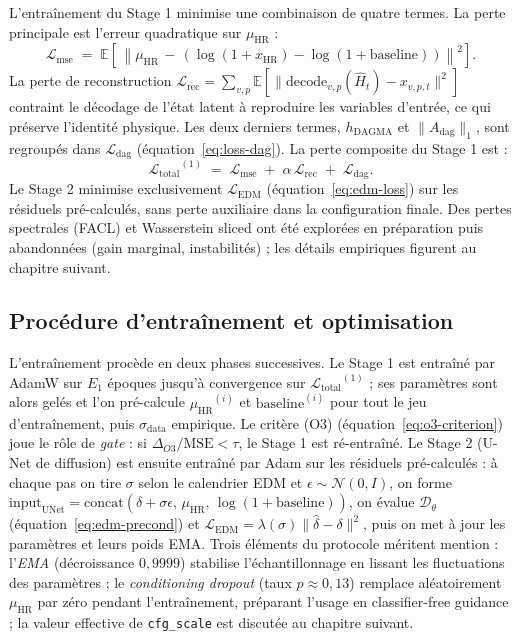 \documentclass[14pt,a4paper,openany]{extreport}
\theoremstyle{definition}
\newcommand{\HR}{\ensuremath{\text{HR}}}
\newcommand{\xHR}{\ensuremath{x_{\HR}}}
\newcommand{\muHR}{\ensuremath{\mu_{\HR}}}
\newcommand{\Adag}{\ensuremath{A_{\mathrm{dag}}}}
\newcommand{\Lmse}{\ensuremath{\mathcal{L}_{\mathrm{mse}}}}
\newcommand{\Lrec}{\ensuremath{\mathcal{L}_{\mathrm{rec}}}}
\newcommand{\LEDM}{\ensuremath{\mathcal{L}_{\mathrm{EDM}}}}
\newcommand{\Ltotal}{\ensuremath{\mathcal{L}_{\mathrm{total}}}}
\begin{document}
L'entraînement du Stage 1 minimise une combinaison de quatre termes. La perte principale est l'erreur quadratique sur $\muHR$ :
\begin{equation}
  \Lmse \;=\; \mathbb{E}\!\left[\, \left\| \muHR \,-\, \left( \log(1 + \xHR) - \log(1 + \mathrm{baseline}) \right) \right\|^2 \right].
  \label{eq:loss-mse}
\end{equation}
La perte de reconstruction $\Lrec = \sum_{v,p} \mathbb{E}[\| \mathrm{decode}_{v,p}(\hat{H}_t) - x_{v,p,t} \|^2]$ contraint le décodage de l'état latent à reproduire les variables d'entrée, ce qui préserve l'identité physique. Les deux derniers termes, $h_{\mathrm{DAGMA}}$ et $\|\Adag\|_1$, sont regroupés dans $\mathcal{L}_{\mathrm{dag}}$ (équation~\ref{eq:loss-dag}). La perte composite du Stage 1 est :
\begin{equation}
  \Ltotal^{(1)} \;=\; \Lmse \;+\; \alpha\, \Lrec \;+\; \mathcal{L}_{\mathrm{dag}}.
  \label{eq:loss-total-stage1}
\end{equation}
Le Stage 2 minimise exclusivement $\LEDM$ (équation~\ref{eq:edm-loss}) sur les résiduels pré-calculés, sans perte auxiliaire dans la configuration finale. Des pertes spectrales (FACL) et Wasserstein sliced ont été explorées en préparation puis abandonnées (gain marginal, instabilités) ; les détails empiriques figurent au chapitre suivant.

\subsection{Procédure d'entraînement et optimisation}
\label{ssec:oracle-train-procedure}

L'entraînement procède en deux phases successives. Le Stage 1 est entraîné par AdamW sur $E_1$ époques jusqu'à convergence sur $\Ltotal^{(1)}$ ; ses paramètres sont alors gelés et l'on pré-calcule $\muHR^{(i)}$ et $\mathrm{baseline}^{(i)}$ pour tout le jeu d'entraînement, puis $\sigma_{\mathrm{data}}$ empirique. Le critère (O3) (équation~\ref{eq:o3-criterion}) joue le rôle de \emph{gate} : si $\Delta_{O3}/\mathrm{MSE} < \tau$, le Stage 1 est ré-entraîné. Le Stage 2 (U-Net de diffusion) est ensuite entraîné par Adam sur les résiduels pré-calculés : à chaque pas on tire $\sigma$ selon le calendrier EDM et $\epsilon \sim \mathcal{N}(0, I)$, on forme $\mathrm{input}_{\mathrm{UNet}} = \mathrm{concat}(\delta + \sigma\epsilon,\, \muHR,\, \log(1+\mathrm{baseline}))$, on évalue $\mathcal{D}_\theta$ (équation~\ref{eq:edm-precond}) et $\LEDM = \lambda(\sigma)\|\hat\delta - \delta\|^2$, puis on met à jour les paramètres et leurs poids EMA. Trois éléments du protocole méritent mention : l'\emph{EMA} (décroissance $0{,}9999$) stabilise l'échantillonnage en lissant les fluctuations des paramètres ; le \emph{conditioning dropout} (taux $p \approx 0{,}13$) remplace aléatoirement $\muHR$ par zéro pendant l'entraînement, préparant l'usage en classifier-free guidance ; la valeur effective de \texttt{cfg\_scale} est discutée au chapitre suivant.
\end{document}
